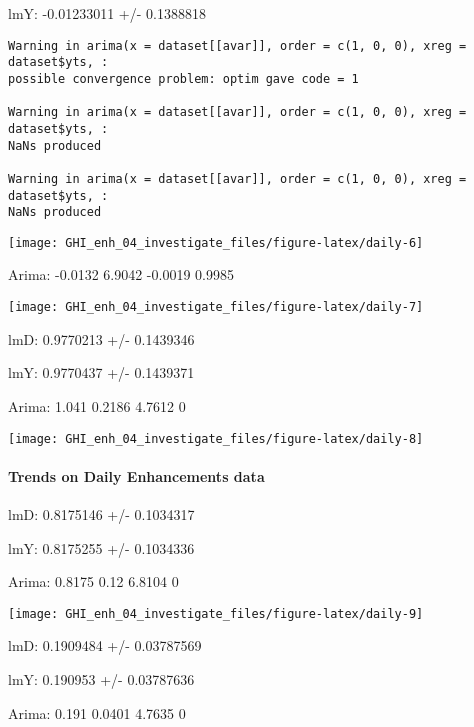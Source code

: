 \documentclass[
  10pt,
  a4paper,oneside]{article}
\begin{document}
lmY: -0.01233011 +/- 0.1388818

\begin{verbatim}
Warning in arima(x = dataset[[avar]], order = c(1, 0, 0), xreg = dataset$yts, :
possible convergence problem: optim gave code = 1

Warning in arima(x = dataset[[avar]], order = c(1, 0, 0), xreg = dataset$yts, :
NaNs produced

Warning in arima(x = dataset[[avar]], order = c(1, 0, 0), xreg = dataset$yts, :
NaNs produced
\end{verbatim}

\begin{center}\texttt{[image: GHI\_enh\_04\_investigate\_files/figure-latex/daily-6]} \end{center}

Arima: -0.0132 6.9042 -0.0019 0.9985

\begin{center}\texttt{[image: GHI\_enh\_04\_investigate\_files/figure-latex/daily-7]} \end{center}

lmD: 0.9770213 +/- 0.1439346

lmY: 0.9770437 +/- 0.1439371

Arima: 1.041 0.2186 4.7612 0

\begin{center}\texttt{[image: GHI\_enh\_04\_investigate\_files/figure-latex/daily-8]} \end{center}

\newpage

\hypertarget{trends-on-daily-enhancements-data}{%
\paragraph{Trends on Daily Enhancements data}\label{trends-on-daily-enhancements-data}}

lmD: 0.8175146 +/- 0.1034317

lmY: 0.8175255 +/- 0.1034336

Arima: 0.8175 0.12 6.8104 0

\begin{center}\texttt{[image: GHI\_enh\_04\_investigate\_files/figure-latex/daily-9]} \end{center}

lmD: 0.1909484 +/- 0.03787569

lmY: 0.190953 +/- 0.03787636

Arima: 0.191 0.0401 4.7635 0
\end{document}
